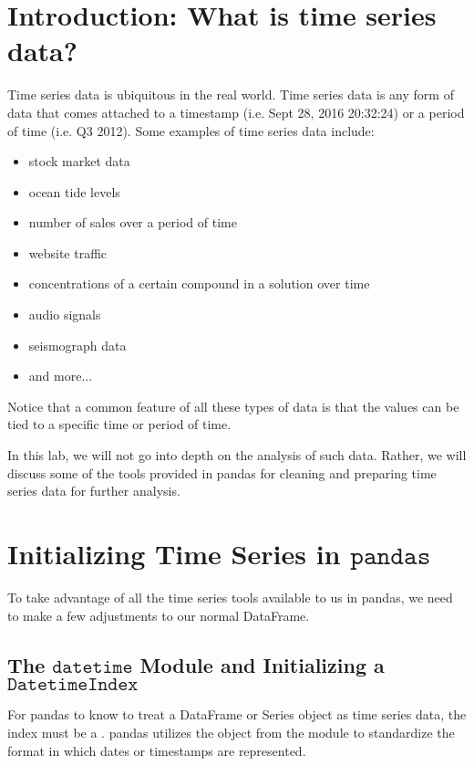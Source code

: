 \label{lab:pandas4}


\section*{Introduction: What is time series data?}
Time series data is ubiquitous in the real world. Time series data is any form of data that comes attached to a timestamp (i.e. Sept 28, 2016 20:32:24) or a period of time (i.e. Q3 2012). Some examples of time series data include:
\begin{itemize}
    \item stock market data
    \item ocean tide levels
    \item number of sales over a period of time
    \item website traffic
    \item concentrations of a certain compound in a solution over time
    \item audio signals
    \item seismograph data
    \item and more...
\end{itemize}

Notice that a common feature of all these types of data is that the values can be tied to a specific time or period of time.

In this lab, we will not go into depth on the analysis of such data. Rather, we will discuss some of the tools provided in pandas for cleaning and preparing time series data for further analysis.

\section*{Initializing Time Series in $\texttt{pandas}$}
To take advantage of all the time series tools available to us in pandas, we need to make a few adjustments to our normal DataFrame.

\subsection*{The $\texttt{datetime}$ Module and Initializing a $\texttt{DatetimeIndex}$}
For pandas to know to treat a DataFrame or Series object as time series data, the index must be a . pandas utilizes the  object from the  module to standardize the format in which dates or timestamps are represented.

